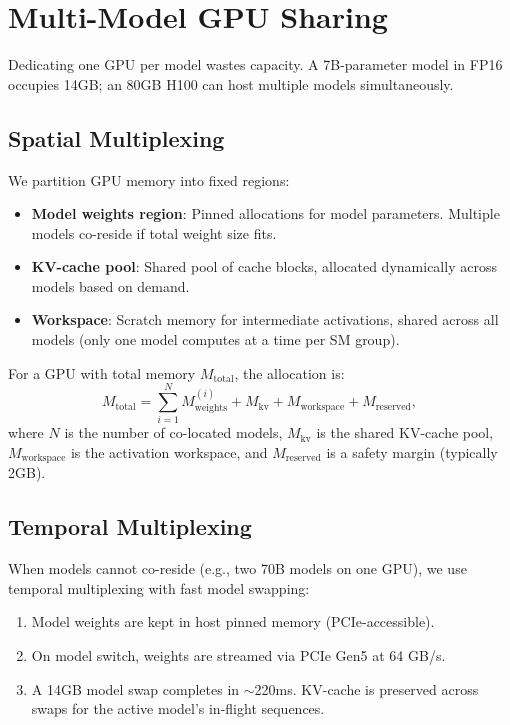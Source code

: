 \section{Multi-Model GPU Sharing}

\label{sec:sharing}

Dedicating one GPU per model wastes capacity. A 7B-parameter model in FP16
occupies 14GB; an 80GB H100 can host multiple models simultaneously.

\subsection{Spatial Multiplexing}

We partition GPU memory into fixed regions:
\begin{itemize}[leftmargin=1.1em]
    \item \textbf{Model weights region}: Pinned allocations for model parameters.
    Multiple models co-reside if total weight size fits.
    \item \textbf{KV-cache pool}: Shared pool of cache blocks, allocated
    dynamically across models based on demand.
    \item \textbf{Workspace}: Scratch memory for intermediate activations,
    shared across all models (only one model computes at a time per SM group).
\end{itemize}

\begin{definition}
For a GPU with total memory $M_{\text{total}}$, the allocation is:
\begin{equation}
M_{\text{total}} = \sum_{i=1}^{N} M_{\text{weights}}^{(i)} +
M_{\text{kv}} + M_{\text{workspace}} + M_{\text{reserved}},
\end{equation}
where $N$ is the number of co-located models, $M_{\text{kv}}$ is the shared
KV-cache pool, $M_{\text{workspace}}$ is the activation workspace, and
$M_{\text{reserved}}$ is a safety margin (typically 2GB).
\end{definition}

\subsection{Temporal Multiplexing}

When models cannot co-reside (e.g., two 70B models on one GPU), we use temporal
multiplexing with fast model swapping:
\begin{enumerate}[leftmargin=1.4em]
    \item Model weights are kept in host pinned memory (PCIe-accessible).
    \item On model switch, weights are streamed via PCIe Gen5 at 64 GB/s.
    \item A 14GB model swap completes in $\sim$220ms. KV-cache is preserved
    across swaps for the active model's in-flight sequences.
\end{enumerate}

